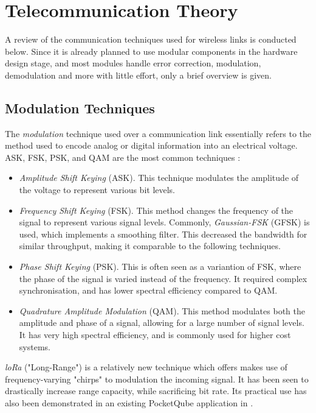 \section{Telecommunication Theory}\label{sec:telecommunication_theory}
A review of the communication techniques used for wireless links is conducted below. Since it is already planned to use modular components in the hardware design stage, and most modules handle error correction, modulation, demodulation and more with little effort, only a brief overview is given.

\subsection{Modulation Techniques}
The \textit{modulation} technique used over a communication link essentially refers to the method used to encode analog or digital information into an electrical voltage. ASK, FSK, PSK, and QAM are the most common techniques \cite{site-satelliteModulationOverview} \cite{site-satelliteModulationComparison}:
\begin{itemize}
    \item \textit{Amplitude Shift Keying} (ASK). This technique modulates the amplitude of the voltage to represent various bit levels.
    \item \textit{Frequency Shift Keying} (FSK). This method changes the frequency of the signal to represent various signal levels. Commonly, \textit{Gaussian-FSK} (GFSK) is used, which implements a smoothing filter. This decreased the bandwidth for similar throughput, making it comparable to the following techniques.
    \item \textit{Phase Shift Keying} (PSK). This is often seen as a variantion of FSK, where the phase of the signal is varied instead of the frequency. It required complex synchronisation, and has lower spectral efficiency compared to QAM.
    \item \textit{Quadrature Amplitude Modulation} (QAM). This method modulates both the amplitude and phase of a signal, allowing for a large number of signal levels. It has very high spectral efficiency, and is commonly used for higher cost systems.
\end{itemize}

\textit{loRa} ("Long-Range") is a relatively new technique which offers makes use of frequency-varying "chirps" to modulation the incoming signal. It has been seen to drastically increase range capacity, while sacrificing bit rate. Its practical use has also been demonstrated in an existing PocketQube application in \cite{design-FOSSASATLink}.